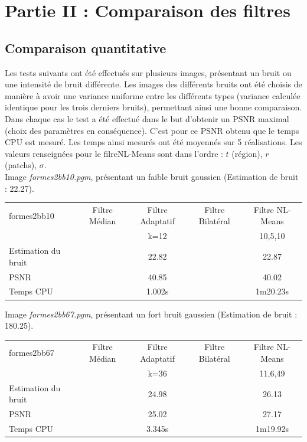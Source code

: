 \documentclass[a4,12pt]{article}
\begin{document}
\section{Partie II : Comparaison des filtres}
\subsection{Comparaison quantitative}

Les tests suivants ont été effectués sur plusieurs images, présentant un bruit ou une intensité de bruit différente. Les images des différents bruits ont été choisis de manière à avoir une variance uniforme entre les différents types (variance calculée identique pour les trois derniers bruits), permettant ainsi une bonne comparaison.\\

Dans chaque cas le test a été effectué dans le but d'obtenir un PSNR maximal (choix des paramètres en conséquence). C'est pour ce PSNR obtenu que le temps CPU est mesuré. Les temps ainsi mesurés ont été moyennés sur 5 réalisations. Les valeurs renseignées pour le filreNL-Means sont dans l'ordre : $t$ (région), $r$ (patchs), $\sigma$.\\

Image \textit{formes2bb10.pgm}, présentant un faible bruit gaussien (Estimation de bruit : 22.27).

\begin{center}
\begin{tabular}{|l||c|c|c|c|}
\hline
formes2bb10 & Filtre Médian & Filtre Adaptatif & Filtre Bilatéral & Filtre NL-Means \\
& & k=12 & & 10,5,10\\
\hline
Estimation du bruit
&
& 22.82
&
& 22.87\\
\hline
PSNR
&
& 40.85
&
& 40.02\\
\hline
Temps CPU
& 
& 1.002s
&
& 1m20.23s\\
\hline
\end{tabular} 
\end{center}

\vspace{2em}

Image \textit{formes2bb67.pgm}, présentant un fort bruit gaussien (Estimation de bruit : 180.25).

\begin{center}
\begin{tabular}{|l||c|c|c|c|}
\hline
formes2bb67 & Filtre Médian & Filtre Adaptatif & Filtre Bilatéral & Filtre NL-Means\\
& & k=36 & & 11,6,49\\
\hline
Estimation du bruit
&
& 24.98
&
& 26.13\\
\hline
PSNR
&
& 25.02
&
& 27.17\\
\hline
Temps CPU
&
& 3.345s
&
& 1m19.92s\\
\hline
\end{tabular} 
\end{center}
\end{document}

